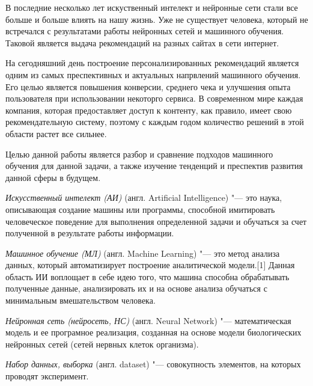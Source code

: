 \documentclass[bachelor, och, coursework]{SCWorks}
\begin{document}

\tableofcontents

\intro

    В последние несколько лет искуственный интелект и нейронные сети стали все
    больше и больше влиять на нашу жизнь. Уже не существует человека, который
    не встречался с результатами работы нейронных сетей и машинного обучения.
    Таковой является выдача рекомендаций на разных сайтах в сети интернет.

    На сегодняшний день построение персонализированных рекомендаций является
    одним из самых преспективных и актуальных напрвлений машинного обучения.
    Его целью является повышения конверсии, среднего чека и улучшения опыта
    пользователя при использовании некоторго сервиса. В современном мире
    каждая компания, которая предоставляет доступ к контенту, как правило,
    имеет свою рекомендательную систему, поэтому с каждым годом количество
    решений в этой области растет все сильнее.

    Целью данной работы является разбор и сравнение подходов машинного
    обучения для данной задачи, а также изучение тенденций и преспектив развития 
    данной сферы в будущем.


\textit{Искусственный интелект (АИ)} (англ. Artificial Intelligence) "--- это наука, описывающая создание машины или программы,
способной имитировать человеческое поведение для выполнения определенной задачи и обучаться
за счет полученной в результате работы информации.

\textit{Машинное обучение (МЛ)} (англ. Machine Learning) "--- это метод анализа данных, который автоматизирует построение аналитической 
модели.[1] Данная область ИИ воплощает в себе идею того, что машина способна обрабатывать полученные данные, анализировать их 
и на основе анализа обучаться с минимальным вмешательством человека.

\textit{Нейронная сеть (нейросеть, НС)}  (англ. Neural Network) "--- математическая модель и ее програмное реализация, созданная
на основе модели биологических нейронных сетей (сетей нервных клеток организма).

\textit{Набор данных, выборка} (англ. dataset) "--- совокупность элементов, на которых проводят эксперимент.
\end{document}
